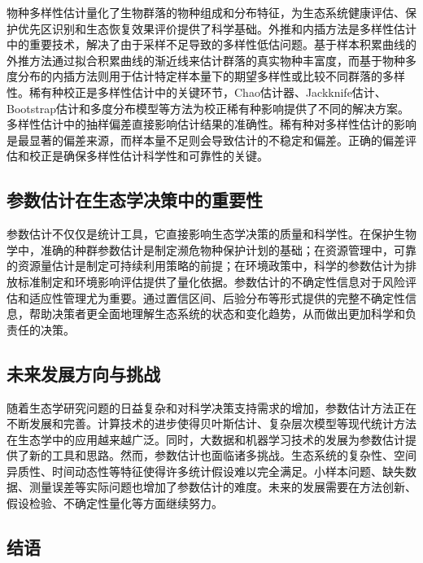 \documentclass[
  twoside,12pt,fontset=none]{ctexbook}
\begin{document}
物种多样性估计量化了生物群落的物种组成和分布特征，为生态系统健康评估、保护优先区识别和生态恢复效果评价提供了科学基础。外推和内插方法是多样性估计中的重要技术，解决了由于采样不足导致的多样性低估问题。基于样本积累曲线的外推方法通过拟合积累曲线的渐近线来估计群落的真实物种丰富度，而基于物种多度分布的内插方法则用于估计特定样本量下的期望多样性或比较不同群落的多样性。稀有种校正是多样性估计中的关键环节，Chao估计器、Jackknife估计、Bootstrap估计和多度分布模型等方法为校正稀有种影响提供了不同的解决方案。多样性估计中的抽样偏差直接影响估计结果的准确性。稀有种对多样性估计的影响是最显著的偏差来源，而样本量不足则会导致估计的不稳定和偏差。正确的偏差评估和校正是确保多样性估计科学性和可靠性的关键。

\hypertarget{ux53c2ux6570ux4f30ux8ba1ux5728ux751fux6001ux5b66ux51b3ux7b56ux4e2dux7684ux91cdux8981ux6027}{%
\subsection{参数估计在生态学决策中的重要性}\label{ux53c2ux6570ux4f30ux8ba1ux5728ux751fux6001ux5b66ux51b3ux7b56ux4e2dux7684ux91cdux8981ux6027}}

参数估计不仅仅是统计工具，它直接影响生态学决策的质量和科学性。在保护生物学中，准确的种群参数估计是制定濒危物种保护计划的基础；在资源管理中，可靠的资源量估计是制定可持续利用策略的前提；在环境政策中，科学的参数估计为排放标准制定和环境影响评估提供了量化依据。参数估计的不确定性信息对于风险评估和适应性管理尤为重要。通过置信区间、后验分布等形式提供的完整不确定性信息，帮助决策者更全面地理解生态系统的状态和变化趋势，从而做出更加科学和负责任的决策。

\hypertarget{ux672aux6765ux53d1ux5c55ux65b9ux5411ux4e0eux6311ux6218}{%
\subsection{未来发展方向与挑战}\label{ux672aux6765ux53d1ux5c55ux65b9ux5411ux4e0eux6311ux6218}}

随着生态学研究问题的日益复杂和对科学决策支持需求的增加，参数估计方法正在不断发展和完善。计算技术的进步使得贝叶斯估计、复杂层次模型等现代统计方法在生态学中的应用越来越广泛。同时，大数据和机器学习技术的发展为参数估计提供了新的工具和思路。然而，参数估计也面临诸多挑战。生态系统的复杂性、空间异质性、时间动态性等特征使得许多统计假设难以完全满足。小样本问题、缺失数据、测量误差等实际问题也增加了参数估计的难度。未来的发展需要在方法创新、假设检验、不确定性量化等方面继续努力。

\hypertarget{ux7ed3ux8bed}{%
\subsection{结语}\label{ux7ed3ux8bed}}
\end{document}
